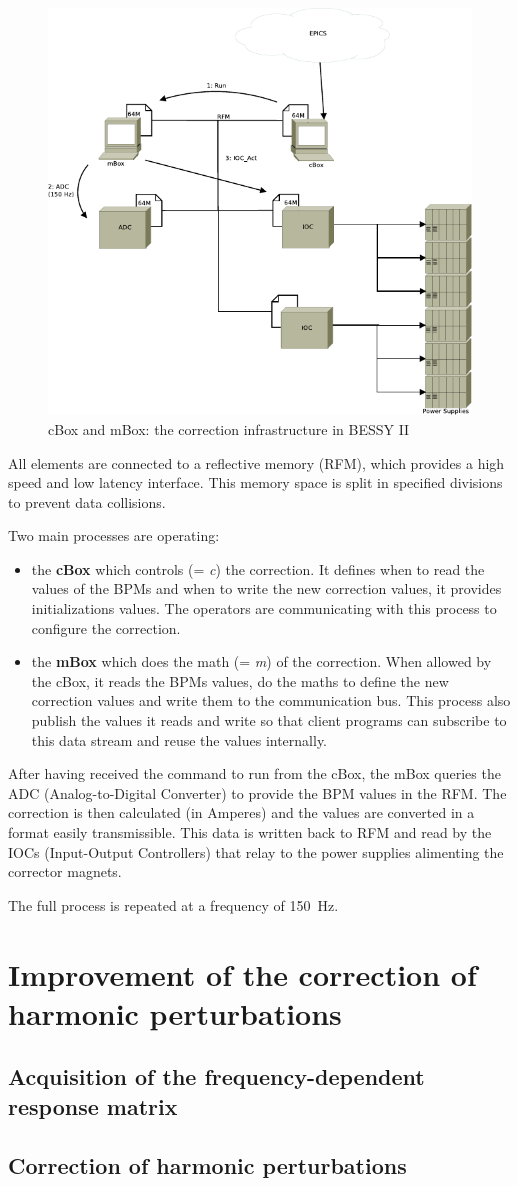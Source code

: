 \begin{figure}[!h]
    \centering
    \includegraphics[width=.85\linewidth]{img/mBox_cBox}
    \caption{\label{fig:cbox_mbox}cBox and mBox: the correction infrastructure in BESSY II}
\end{figure}

All elements are connected to a reflective memory (RFM), which provides a high speed and low latency interface. This memory space is split in specified divisions to prevent data collisions.

Two main processes are operating:
\begin{itemize}
    \item the \textbf{cBox} which controls (= \textit{c}) the correction. It defines when to read the values of the BPMs and when to write the new correction values, it provides initializations values. The operators are communicating with this process to configure the correction.
    \item the \textbf{mBox} which does the math (= \textit{m}) of the correction. When allowed by the cBox, it reads the BPMs values, do the maths to define the new correction values and write them to the communication bus. This process also publish the values it reads and write so that client programs can subscribe to this data stream and reuse the values internally.
\end{itemize}

After having received the command to run from the cBox, the mBox queries the ADC (Analog-to-Digital Converter) to provide the BPM values in the RFM. The correction is then calculated (in Amperes) and the values are converted in a format easily transmissible. This data is written back to RFM and read by the IOCs (Input-Output Controllers) that relay to the power supplies alimenting the corrector magnets.

The full process is repeated at a frequency of 150~Hz. 

\section{Improvement of the correction of harmonic perturbations}
\subsection{Acquisition of the frequency-dependent response matrix}
\subsection{Correction of harmonic perturbations}
